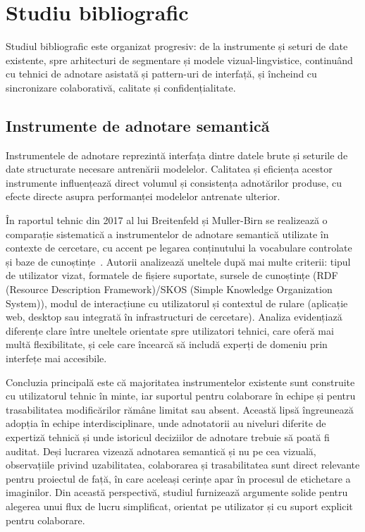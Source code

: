 \chapter{Studiu bibliografic}\label{ch:studiubib}

\pagestyle{fancy}

Studiul bibliografic este organizat progresiv: de la instrumente și seturi de date existente, spre arhitecturi de segmentare și modele vizual-lingvistice, continuând cu tehnici de adnotare asistată și pattern-uri de interfață, și încheind cu sincronizare colaborativă, calitate și confidențialitate.
\section{Instrumente de adnotare semantică}

Instrumentele de adnotare reprezintă interfața dintre datele brute și seturile de date structurate necesare antrenării modelelor. Calitatea și eficiența acestor instrumente influențează direct volumul și consistența adnotărilor produse, cu efecte directe asupra performanței modelelor antrenate ulterior.

În raportul tehnic din 2017 al lui Breitenfeld și Muller-Birn se realizează o comparație sistematică a instrumentelor de adnotare semantică utilizate în contexte de cercetare, cu accent pe legarea conținutului la vocabulare controlate și baze de cunoștințe~\cite{Breitenfeld2017}. Autorii analizează uneltele după mai multe criterii: tipul de utilizator vizat, formatele de fișiere suportate, sursele de cunoștințe (RDF (Resource Description Framework)/SKOS (Simple Knowledge Organization System)), modul de interacțiune cu utilizatorul și contextul de rulare (aplicație web, desktop sau integrată în infrastructuri de cercetare). Analiza evidențiază diferențe clare între uneltele orientate spre utilizatori tehnici, care oferă mai multă flexibilitate, și cele care încearcă să includă experți de domeniu prin interfețe mai accesibile.

Concluzia principală este că majoritatea instrumentelor existente sunt construite cu utilizatorul tehnic în minte, iar suportul pentru colaborare în echipe și pentru trasabilitatea modificărilor rămâne limitat sau absent. Această lipsă îngreunează adopția în echipe interdisciplinare, unde adnotatorii au niveluri diferite de expertiză tehnică și unde istoricul deciziilor de adnotare trebuie să poată fi auditat. Deși lucrarea vizează adnotarea semantică și nu pe cea vizuală, observațiile privind uzabilitatea, colaborarea și trasabilitatea sunt direct relevante pentru proiectul de față, în care aceleași cerințe apar în procesul de etichetare a imaginilor. Din această perspectivă, studiul furnizează argumente solide pentru alegerea unui flux de lucru simplificat, orientat pe utilizator și cu suport explicit pentru colaborare.


